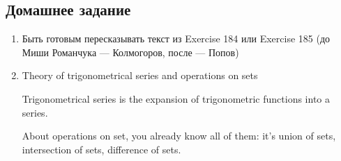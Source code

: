 \documentclass{article}
\begin{document}
\subsection{Домашнее задание}

\begin{enumerate}
    \item Быть готовым пересказывать текст из Exercise 184 или Exercise 185 (до Миши Романчука — Колмогоров, после — Попов)
    \item Theory of trigonometrical series and operations on sets

    Trigonometrical series is the expansion of trigonometric functions into a series.
    
    About operations on set, you already know all of them: it's union of sets, intersection of sets, difference of sets.
\end{enumerate}
\end{document}
